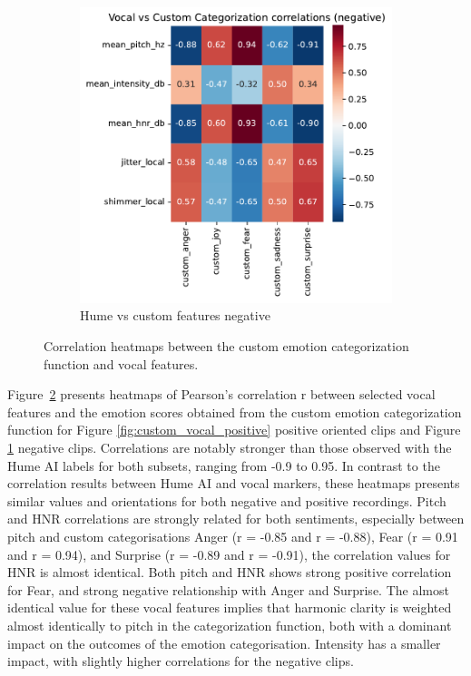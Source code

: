 \begin{figure}[H]
\begin{subfigure}[b]{0.45\textwidth}
        \includegraphics[width=\textwidth]{png/results/rq1_new/vocal_vs_custom_categorization_correlations_negative.pdf}
        \caption{Hume vs custom features negative}        
        \label{fig:custom_vocal_negative}
    \end{subfigure} 
    \caption{Correlation heatmaps between the custom emotion categorization function and vocal features.}
    \label{fig:rq1_heatmaps_custom}       
\end{figure}
Figure~\ref{fig:rq1_heatmaps_custom} presents heatmaps of Pearson’s correlation r between selected vocal features and the emotion scores obtained from the custom emotion categorization 
function for Figure \ref{fig:custom_vocal_positive} positive oriented clips and Figure \ref{fig:custom_vocal_negative} negative clips. Correlations are notably stronger than those observed with the Hume AI labels for both subsets, ranging from -0.9 to 0.95. 
In contrast to the correlation results between Hume AI and vocal markers, these heatmaps presents similar values and orientations for both negative and positive recordings. Pitch and HNR correlations are strongly related for both sentiments, especially between 
pitch and custom categorisations Anger (r = -0.85 and r = -0.88), Fear (r = 0.91 and r = 0.94), and Surprise (r = -0.89 and r = -0.91), the correlation values for HNR is almost identical. Both pitch and HNR shows strong positive correlation for Fear, and strong negative relationship with Anger and Surprise. The almost identical value for these vocal features implies that harmonic clarity is weighted almost identically to pitch in the categorization function, both with a dominant impact on the outcomes of the emotion categorisation. Intensity has a smaller impact, with slightly higher correlations for the negative clips. 
